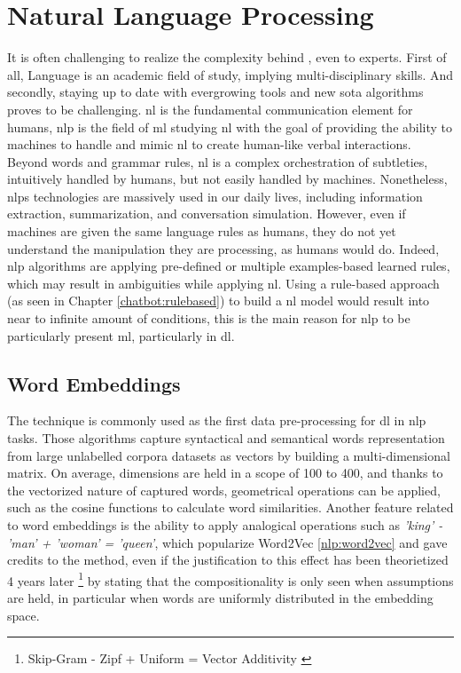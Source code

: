 \chapter{Natural Language Processing}
\label{chap:nlp}

It is often challenging to realize the complexity behind , even to experts. First of all, Language is an academic field of study, implying multi-disciplinary skills. And secondly, staying up to date with evergrowing tools and new \gls{sota} algorithms proves to be challenging. \gls{nl} is the fundamental communication element for humans, \gls{nlp} is the field of \gls{ml} studying \gls{nl} with the goal of providing the ability to machines to handle and mimic \gls{nl} to create human-like verbal interactions. Beyond words and grammar rules, \gls{nl} is a complex orchestration of subtleties, intuitively handled by humans, but not easily handled by machines. Nonetheless, \glspl{nlp} technologies are massively used in our daily lives, including information extraction, summarization, and conversation simulation. However, even if machines are given the same language rules as humans, they do not yet understand the manipulation they are processing, as humans would do. Indeed, \gls{nlp} algorithms are applying pre-defined or multiple examples-based learned rules, which may result in ambiguities while applying \gls{nl}. Using a rule-based approach (as seen in Chapter \ref{chatbot:rulebased}) to build a \gls{nl} model would result into near to infinite amount of conditions, this is the main reason for \gls{nlp} to be particularly present \gls{ml}, particularly in \gls{dl}. 


\section{Word Embeddings}
\label{nlp:we}
The technique is commonly used as the first data pre-processing for \gls{dl} in \gls{nlp} tasks. Those  algorithms capture syntactical and semantical words representation from large unlabelled corpora datasets as vectors by building a multi-dimensional matrix. On average, dimensions are held in a scope of 100 to 400, and thanks to the vectorized nature of captured words, geometrical operations can be applied, such as the cosine functions to calculate word similarities. Another feature related to word embeddings is the ability to apply analogical operations such as \textit{'king' - 'man' + 'woman' = 'queen'}, which popularize Word2Vec \ref{nlp:word2vec} and gave credits to the method, even if the justification to this effect has been theorietized 4 years later \footnote{Skip-Gram - Zipf + Uniform = Vector Additivity \autocite{paper:gittens-etal-2017-skip}} by stating that the compositionality is only seen when assumptions are held, in particular when words are uniformly distributed in the embedding space.

